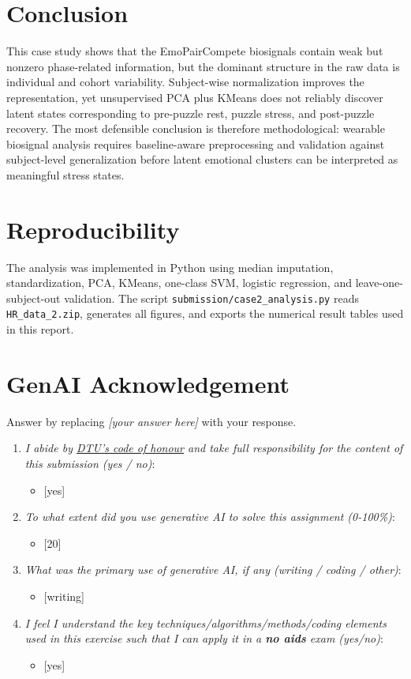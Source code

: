 \documentclass{article}
\begin{document}
\section*{Conclusion}
This case study shows that the EmoPairCompete biosignals contain weak but nonzero phase-related information, but the dominant structure in the raw data is individual and cohort variability. Subject-wise normalization improves the representation, yet unsupervised PCA plus KMeans does not reliably discover latent states corresponding to pre-puzzle rest, puzzle stress, and post-puzzle recovery. The most defensible conclusion is therefore methodological: wearable biosignal analysis requires baseline-aware preprocessing and validation against subject-level generalization before latent emotional clusters can be interpreted as meaningful stress states.

\section*{Reproducibility}
The analysis was implemented in Python using median imputation, standardization, PCA, KMeans, one-class SVM, logistic regression, and leave-one-subject-out validation. The script \texttt{submission/case2\_analysis.py} reads \texttt{HR\_data\_2.zip}, generates all figures, and exports the numerical result tables used in this report.

\section*{GenAI Acknowledgement}
Answer by replacing \textit{[your answer here]} with your response.
\begin{enumerate}
    \item \textit{I abide by \href{https://student.dtu.dk/en/exam/exam-cheating/dtu-code-of-honour}{DTU's code of honour} and take full responsibility for the content of this submission (yes / no)}:
    \begin{itemize}
        \item {[yes]}
    \end{itemize}
    \item \textit{To what extent did you use generative AI to solve this assignment (0-100\%)}:
    \begin{itemize}
        \item {[20]}
    \end{itemize}
    \item \textit{What was the primary use of generative AI, if any (writing / coding / other)}:
    \begin{itemize}
        \item {[writing]}
    \end{itemize}
    \item \textit{I feel I understand the key techniques/algorithms/methods/coding elements used in this exercise such that I can apply it in a \textbf{no aids} exam (yes/no)}:
    \begin{itemize}
        \item {[yes]}
    \end{itemize}
\end{enumerate}
\end{document}

